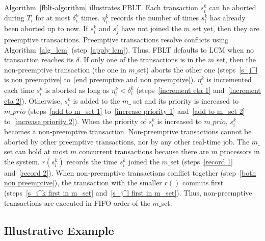 \documentclass[prodmode,acmtecs]{acmsmall}
\begin{document}
Algorithm~\ref{fblt-algorithm} illustrates FBLT. Each transaction $s_{i}^{k}$ can be aborted during $T_i$ for at most $\delta_{i}^{k}$ times. $\eta_{i}^{k}$ records  the number of times $s_{i}^{k}$ has already been aborted up to now. If $s_i^k$ and $s_j^l$ have not joined the $m\_$set yet, then they are preemptive transactions. Preemptive transactions resolve conflicts using Algorithm~\ref{alg_lcm} (step~\ref{apply lcm}). Thus, FBLT defaults to LCM when no transaction reaches its $\delta$. If only one of the transactions is in the $m\_$set, then the non-preemptive transaction (the one in $m\_$set) aborts the other one (steps~\ref{s_j^l is non preemptive} to~\ref{end preemptive and non preemptive}). $\eta_i^k$ is incremented each time $s_i^k$ is aborted as long as $\eta_i^k < \delta_i^k$ (steps~\ref{increment eta 1} and~\ref{increment eta 2}). Otherwise, $s_i^k$ is added to the $m\_$ set and its priority is increased to $m\_prio$ (steps~\ref{add to m_set 1} to~\ref{increase priority 1} and~\ref{add to m_set 2} to~\ref{increase priority 2}). When the priority of $s_i^k$ is increased to $m\_prio$, $s_i^k$ becomes a non-preemptive transaction. Non-preemptive transactions cannot be aborted by other preemptive transactions, nor by any other real-time job. The $m\_$set can hold at most $m$ concurrent transactions because there are $m$ processors in the system. $r(s_i^k)$ records the time $s_i^k$ joined the $m\_$set (steps~\ref{record 1} and~\ref{record 2}). When non-preemptive transactions conflict together (step~\ref{both non preemptive}), the transaction with the smaller $r()$ commits first (steps~\ref{s_i^k first in m_set} and~\ref{s_j^l first in m_set}). Thus, non-preemptive transactions are executed in FIFO order of the $m\_$set.

\subsection{Illustrative Example}
\end{document}
